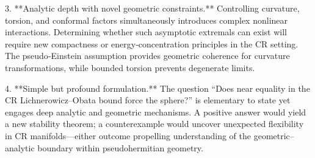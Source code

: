 3. **Analytic depth with novel geometric constraints.**  
   Controlling curvature, torsion, and conformal factors simultaneously introduces complex nonlinear interactions. Determining whether such asymptotic extremals can exist will require new compactness or energy‑concentration principles in the CR setting. The pseudo‑Einstein assumption provides geometric coherence for curvature transformations, while bounded torsion prevents degenerate limits.

4. **Simple but profound formulation.**  
   The question “Does near equality in the CR Lichnerowicz–Obata bound force the sphere?” is elementary to state yet engages deep analytic and geometric mechanisms. A positive answer would yield a new stability theorem; a counterexample would uncover unexpected flexibility in CR manifolds—either outcome propelling understanding of the geometric–analytic boundary within pseudohermitian geometry.